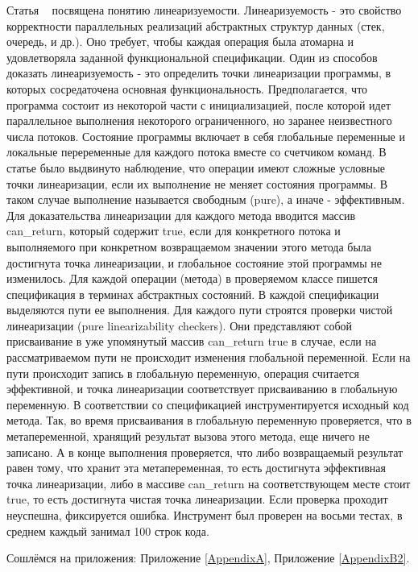 Статья ~\cite{Vafeiadis:2010} посвящена понятию линеаризуемости.
Линеаризуемость - это свойство корректности параллельных реализаций абстрактных структур данных (стек, очередь, и др.). Оно требует, чтобы каждая операция была атомарна и удовлетворяла заданной функциональной спецификации. Один из способов доказать линеаризуемость - это определить точки линеаризации программы, в которых сосредаточена основная функциональность.
Предполагается, что программа состоит из некоторой части с инициализацией, после которой идет параллельное выполнения некоторого ограниченного, но заранее неизвестного числа потоков. Состояние программы включает в себя глобальные переменные и локальные переременные для каждого потока вместе со счетчиком команд.
В статье было выдвинуто наблюдение, что операции имеют сложные условные точки линеаризации, если их выполнение не меняет состояния программы. В таком случае выполнение называется свободным (pure), а иначе - эффективным. Для доказательства линеаризации для каждого метода вводится массив can\_return, который содержит true, если для конкретного потока и выполняемого при конкретном возвращаемом значении этого метода была достигнута точка линеаризации, и глобальное состояние этой программы не изменилось.
Для каждой операции (метода) в проверяемом классе пишется спецификация в терминах абстрактных состояний. В каждой спецификации выделяются пути ее выполнения. Для каждого пути строятся проверки чистой линеаризации (pure linearizability checkers). Они представляют собой присваивание в уже упомянутый массив can\_return true в случае, если на рассматриваемом пути не происходит изменения глобальной переменной. Если на пути происходит запись в глобальную переменную, операция считается эффективной, и точка линеаризации соответствует присваиванию в глобальную переменную. В соответствии со спецификацией инструментируется исходный код метода. Так, во время присваивания в глобальную переменную проверяется, что в метапеременной, хранящий результат вызова этого метода, еще ничего не записано. А в конце выполнения проверяется, что либо возвращаемый результат равен тому, что хранит эта метапеременная, то есть достигнута эффективная точка линеаризации, либо в массиве can\_return на соответствующем месте стоит true, то есть достигнута чистая точка линеаризации. Если проверка проходит неуспешна, фиксируется ошибка.
Инструмент был проверен на восьми тестах, в среднем каждый занимал 100 строк кода. 

Сошлёмся на приложения: Приложение \ref{AppendixA}, Приложение \ref{AppendixB2}.

